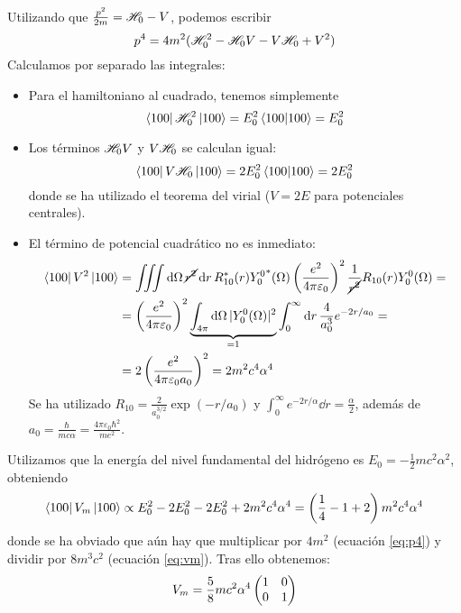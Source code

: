 Utilizando que $\frac{p^2}{2m} =  \mathscr{H} _0 - V$, podemos escribir
\begin{equation}
p^4 = 4m^2 ( \mathscr{H} _0^2 -  \mathscr{H} _0V - V  \mathscr{H} _0 +
V^2)
\label{eq:p4}
\end{equation}
Calculamos por separado las integrales:
\begin{itemize}
\item Para el hamiltoniano al cuadrado, tenemos simplemente
\begin{equation}
  \bra{100} \mathscr{H} _0^2 \ket{100} = E_0^2 \braket{100}{100} = E_0^2
\end{equation}
\item Los términos $ \mathscr{H} _0 V$ y $V  \mathscr{H} _0 $ se calculan
  igual:
  \begin{equation}
    \bra{100}V  \mathscr{H} _0 \ket{100} = 2E_0^2 \braket{100}{100} = 2E_0^2
  \end{equation}
donde se ha utilizado el teorema del virial ($V=2E$ para potenciales centrales).
\item El término de potencial cuadrático no es inmediato:
\begin{equation}
  \begin{split}
    \bra{100}V^2\ket{100} &= \int\!\!\!\int\!\!\!\int \dd{\Omega} \cancel{r^2} \dd{r}
    R_{10}^*(r){Y_0^0}^*(\Omega) \left( \frac{e^2}{4\pi\varepsilon_0}
    \right)^2 \frac{1}{\cancel{r^2}} R_{10}(r)Y_0^0(\Omega) = \\
    &= \left( \frac{e^2}{4\pi\varepsilon_0} \right)^2
    \underbrace{\int_{4\pi} \dd{\Omega}|Y_0^0(\Omega)|^2}_{=1}
    \int_0^\infty \dd{r} \frac{4}{a_0^{3}} e^{-2r/a_0} = \\
    &=2\left( \frac{e^2}{4\pi\varepsilon_0a_0} \right)^2 = 2m^2c^4\alpha^4
  \end{split}
\end{equation}
Se ha utilizado $\displaystyle R_{10} = \frac{2}{a_0^{3/2}}
\exp(-r/a_0)$ y $\displaystyle \int_0^\infty e^{-2r/\alpha} \dd{r} =
\frac{\alpha}{2}$, además de $a_0 = \frac{\hbar}{m c \alpha } =
\frac{4\pi\varepsilon_0 \hbar^2}{me^2}$.
\end{itemize}

Utilizamos que la energía del nivel fundamental del hidrógeno es $E_0
= -\frac{1}{2}mc^2\alpha^2$, obteniendo
\begin{equation}
  \bra{100}V_m\ket{100} \propto E_0^2 -2E_0^2 -2E_0^2 + 2m^2c^4\alpha^4 = \left( \frac{1}{4}-1+2 \right)m^2c^4\alpha^4
\end{equation}
donde se ha obviado que aún hay que multiplicar por $4m^2$ (ecuación
\eqref{eq:p4}) y dividir por $8m^3c^2$ (ecuación \eqref{eq:vm}). Tras
ello obtenemos:
\begin{equation}
  V_m =  \frac{5}{8}mc^2\alpha^4
  \begin{pmatrix}
\imat{2}
  \end{pmatrix}
\end{equation}


